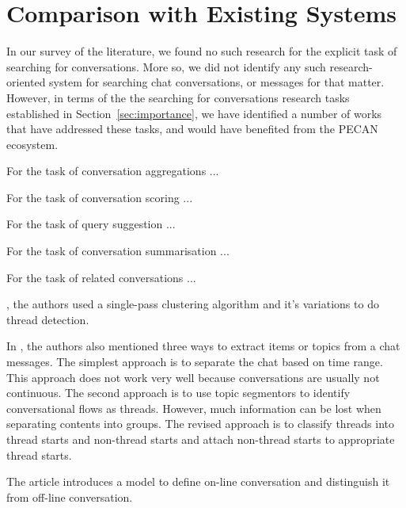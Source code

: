 \section{Comparison with Existing Systems}

In our survey of the literature, we found no such research for the explicit task of searching for conversations. More so, we did not identify any such research-oriented system for searching chat conversations, or messages for that matter. However, in terms of the the searching for conversations research tasks established in Section~\ref{sec:importance}, we have identified a number of works that have addressed these tasks, and would have benefited from the PECAN ecosystem.

For the task of conversation aggregations ...


For the task of conversation scoring ...

For the task of query suggestion ...

For the task of conversation summarisation ...

For the task of related conversations ...


\cite{shen2006thread}, the authors used a single-pass clustering algorithm and it's variations to do thread detection.
	 
In \cite{khan2002mining}, the authors also mentioned three ways to extract items or topics from a chat messages. The simplest approach is to separate the chat based on time range. This approach does not work very well because conversations are usually not continuous. The second approach is to use topic segmentors to identify conversational flows as threads. However, much information can be lost when separating contents into groups. The revised approach is to classify threads into thread starts and non-thread starts and attach non-thread starts to appropriate thread starts. 
	
The article \cite{magnani2012conversation} introduces a model to define on-line conversation and distinguish it from off-line conversation.
	
	